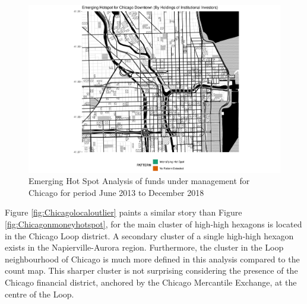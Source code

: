 \begin{figure}
	\centering
	\includegraphics[width=1\linewidth]{Figures/ChapterIV/Chi_Money_EH_Downtown}
	\caption[Emerging Hot Spot Analysis of Funds Under Management for Downtown Chicago 2013-2018]{Emerging Hot Spot Analysis of funds under management for Chicago for period June 2013 to December 2018}
	\label{fig:Chicagonmoneyhotspot_Downtown}
\end{figure}

Figure \ref{fig:Chicagolocaloutlier} paints a similar story than Figure \ref{fig:Chicagonmoneyhotspot}, for the main cluster of high-high hexagons is located in the Chicago Loop district.  A secondary cluster of a single high-high hexagon exists in the Napierville-Aurora region.  Furthermore, the cluster in the Loop neighbourhood of Chicago is much more defined in this analysis compared to the count map. This sharper cluster is not surprising considering the presence of the Chicago financial district, anchored by the Chicago Mercantile Exchange, at the centre of the Loop.


